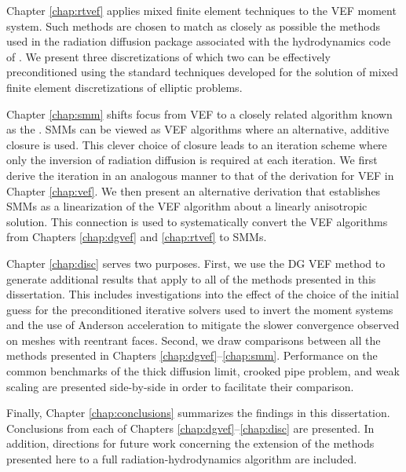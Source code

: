 \documentclass[../doc.tex]{subfiles}
\begin{document}
Chapter \ref{chap:rtvef} applies mixed finite element techniques to the VEF moment system. Such methods are chosen to match as closely as possible the methods used in the radiation diffusion package associated with the hydrodynamics code of \cite{blast}. We present three discretizations of which two can be effectively preconditioned using the standard techniques developed for the solution of mixed finite element discretizations of elliptic problems. 

Chapter \ref{chap:smm} shifts focus from VEF to a closely related algorithm known as the . SMMs can be viewed as VEF algorithms where an alternative, additive closure is used. This clever choice of closure leads to an iteration scheme where only the inversion of radiation diffusion is required at each iteration. We first derive the iteration in an analogous manner to that of the derivation for VEF in Chapter \ref{chap:vef}. We then present an alternative derivation that establishes SMMs as a linearization of the VEF algorithm about a linearly anisotropic solution. This connection is used to systematically convert the VEF algorithms from Chapters \ref{chap:dgvef} and \ref{chap:rtvef} to SMMs. 

Chapter \ref{chap:disc} serves two purposes. First, we use the DG VEF method to generate additional results that apply to all of the methods presented in this dissertation. This includes investigations into the effect of the choice of the initial guess for the preconditioned iterative solvers used to invert the moment systems and the use of Anderson acceleration to mitigate the slower convergence observed on meshes with reentrant faces. Second, we draw comparisons between all the methods presented in Chapters \ref{chap:dgvef}--\ref{chap:smm}. Performance on the common benchmarks of the thick diffusion limit, crooked pipe problem, and weak scaling are presented side-by-side in order to facilitate their comparison. 

Finally, Chapter \ref{chap:conclusions} summarizes the findings in this dissertation. Conclusions from each of Chapters \ref{chap:dgvef}--\ref{chap:disc} are presented. In addition, directions for future work concerning the extension of the methods presented here to a full radiation-hydrodynamics algorithm are included. 
\end{document}
